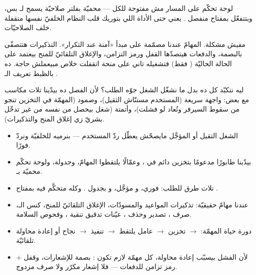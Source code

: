 \begin{secnote}
لوحة تحكّم  على المسار  مش مفتوحة للكل — محميّة بفلتر صلاحيّة
يسمح لـ بس، وبتتفعّل بمفتاح منفصل . يعني حتى الأداة اللي
بتوريك قلب النظام الخلفيّ نفسها متقفلة خلف الصلاحيّات.
\end{secnote}

\begin{qa}
مفيش مشكلة. المهامّ عندنا مصمّمة على مبدأ «آمنة عند التكرار». التذكيرات هتتصفّى بالبصمة،
والدفعات هيتصدّها القفل ورمز التزامن، والإغلاق التلقائيّ للمنح بيعتمد على الحالة الحاليّة
( فقط) فتشغيله تاني على منحة اتقفلت خلاص مبيعملش حاجة. ده بالظبط تعريف الـ
.
\end{qa}

\begin{why}
ليه نتكبّد كل ده بدل ما نشغّل الشغل جوّه الطلب؟ لأن الفصل ده بيدّينا تلات مكاسب مع بعض:
واجهة سريعة (المستخدم مستنّاش الثقيل)، وصمود (المهمّة في التخزين تنجو من سقوط السيرفر
وتُعاد لو فشلت)، وأتمتة (شغل بيحصل من نفسه من غير تدخّل بشريّ زي إغلاق المنح والتذكيرات).
\end{why}

\begin{summary}
\begin{itemize}
  \item الشغل التقيل أو المؤجَّل مايصحّش يعطّل ردّ المستخدم — بنرميه للخلفيّة ونردّ فورًا.
  \item {} بيدّينا طابورًا مدعومًا بتخزين دائم في ، وعمّالًا
  يلتقطوا المهامّ، وجدولة، ولوحة تحكّم محميّة بـ.
  \item تلات طرق للطلب:  فوري، و مؤجَّل، و بجدول
  . وكله متحكَّم فيه بمفتاح .
  \item عندنا مهامّ حقيقيّة: تذكيرات المواعيد والمسودّات، الإغلاق التلقائيّ للمنح، كنس
  الـ، صرف ، تصدير وحذف ، عيّنات تدقيق تنقية ،
  وفحوص السلامة.
  \item دورة حياة المهمّة:  $\rightarrow$ تخزين $\rightarrow$ عامل يلتقط
  $\rightarrow$ تنفيذ $\rightarrow$ نجاح أو إعادة محاولة تلقائيّة.
  \item لأن الفشل بيسبّب إعادة محاولة، كل مهمّة لازم تكون : بصمة
   للإشعارات، وقفل + رمز تزامن للدفعات — فلا إشعار مكرّر ولا صرف
  مزدوج.
\end{itemize}
\end{summary}
